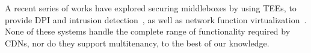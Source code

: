 



%
A recent series of works have explored securing middleboxes by using TEEs, to
provide DPI and intrusion
detection~\cite{han2017sgx,DBLP:journals/corr/abs-1802-00508}, as well as network function
virtualization~\cite{poddar2018safebricks,trach2018shieldbox,goltzsche2018endbox,DBLP:journals/corr/DuanYW17,bhardwaj2018spx}.
%
None of these systems handle the complete range of functionality required by CDNs, nor do they support
multitenancy, to the best of our knowledge.



% 

